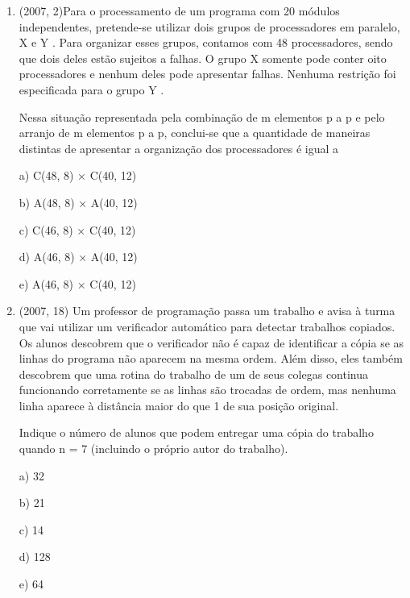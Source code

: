 \documentclass{article}
\begin{document}
\begin{enumerate}
$\rule[1cm]{100cm}{1px}$

total de agentes 16 + 32 = 48

dos 48 agentes escolhemoa 14 cópias = C(48,14)

C(48,14) - C(16,14) para que pelo menos uma tarefa seja executada pelo agente do sistema SMA-B




\newpage


\item(2007, 2)Para o processamento de um programa com 20 módulos independentes, pretende-se utilizar dois grupos de processadores em paralelo, X e Y . Para organizar esses grupos, contamos com 48 processadores, sendo que dois deles estão sujeitos a falhas. O grupo X somente pode conter oito processadores e nenhum deles pode apresentar falhas.
Nenhuma restrição foi especificada para o grupo Y . 

Nessa situação representada pela combinação de m elementos p a p e pelo arranjo de m elementos p a p, conclui-se que a quantidade de maneiras distintas de apresentar a organização dos processadores é igual a

a) C(48, 8) × C(40, 12)

b) A(48, 8) × A(40, 12)

c) C(46, 8) × C(40, 12)

d) A(46, 8) × A(40, 12)

e) A(46, 8) × C(40, 12)\newline



\item(2007, 18) Um professor de programação passa um trabalho e avisa à turma que vai utilizar um verificador automático para detectar trabalhos copiados. Os alunos descobrem que o verificador não é capaz de identificar a cópia se as linhas do programa não aparecem na mesma ordem. Além disso, eles também descobrem que uma rotina do trabalho de um de seus colegas continua funcionando corretamente se as linhas são trocadas de ordem, mas nenhuma linha aparece à distância maior do que 1 de sua posição original.

Indique o número de alunos que podem entregar uma cópia do trabalho quando n = 7 (incluindo o próprio autor do trabalho).

a) 32

b) 21

c) 14

d) 128

e) 64\newline


\end{enumerate}
\end{document}
